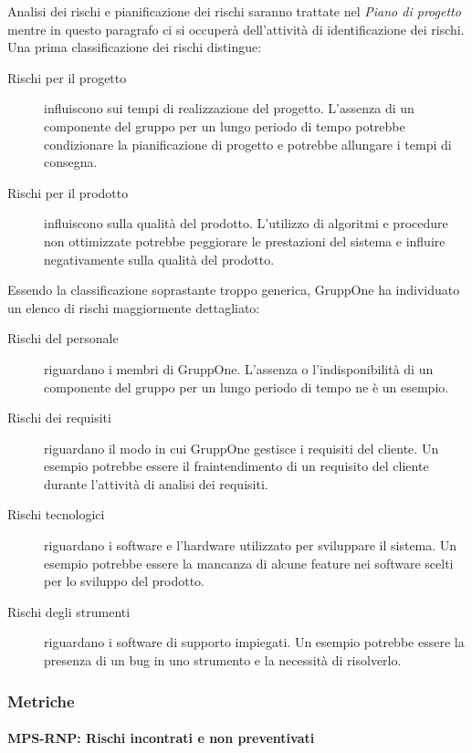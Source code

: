 \documentclass[../norme-di-progetto.tex]{subfiles}
\begin{document}
Analisi dei rischi e pianificazione dei rischi saranno trattate nel \textit{Piano di progetto} mentre in questo paragrafo ci si occuperà dell'attività di identificazione dei rischi.
Una prima classificazione dei rischi distingue:

\begin{description}
  \item [Rischi per il progetto] influiscono sui tempi di realizzazione del progetto. L'assenza di un componente del gruppo per un lungo periodo di tempo potrebbe condizionare la pianificazione di progetto e potrebbe allungare i tempi di consegna.
  \item [Rischi per il prodotto] influiscono sulla qualità del prodotto. L'utilizzo di algoritmi e procedure non ottimizzate potrebbe peggiorare le prestazioni del sistema e influire negativamente sulla qualità del prodotto.
\end{description}
Essendo la classificazione soprastante troppo generica, GruppOne ha individuato un elenco di rischi maggiormente dettagliato:
\begin{description}
  \item [Rischi del personale] riguardano i membri di GruppOne. L'assenza o l'indisponibilità di un componente del gruppo per un lungo periodo di tempo ne è un esempio.
  \item [Rischi dei requisiti] riguardano il modo in cui GruppOne gestisce i requisiti del cliente. Un esempio potrebbe essere il fraintendimento di un requisito del cliente durante l'attività di analisi dei requisiti.
  \item [Rischi tecnologici] riguardano i software e l'hardware utilizzato per sviluppare il sistema. Un esempio potrebbe essere la mancanza di alcune feature nei software scelti per lo sviluppo del prodotto.
  \item [Rischi degli strumenti] riguardano i software di supporto impiegati. Un esempio potrebbe essere la presenza di un bug in uno strumento e la necessità di risolverlo.
\end{description}

\subsubsection{Metriche}%
\label{subs:gestione_dei_rischi/metriche}

\paragraph{MPS-RNP\@: Rischi incontrati e non preventivati}%
\label{par:MPS-RNP_rischi_incontrati_e_non_preventivati}
\end{document}
